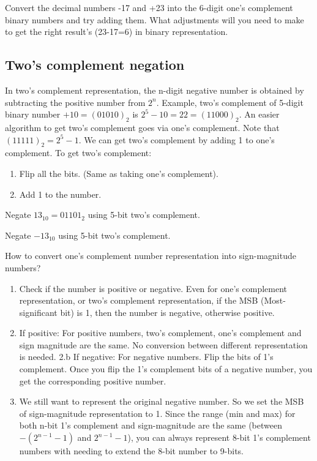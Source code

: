 \begin{prob}
  Convert the decimal numbers -17 and +23 into the 6-digit one's complement binary numbers and try adding them. What
  adjustments will you need to make to get the right result's (23-17=6) in binary representation.
\end{prob}
\vspace{20em}


\subsection{Two's complement negation}
In two's complement representation, the n-digit negative number is obtained by
subtracting the positive number from $2^{n}$. Example, two's
complement of 5-digit binary number $+10 = (01010)_2$ is $2^5 - 10 = 22 =
(11000)_2$. An easier algorithm to get two's complement goes via one's
complement. Note that $(11111)_2 = 2^5-1$. We can get two's complement by adding
1 to one's complement. To get two's complement:
\begin{enumerate}
\item Flip all the bits. (Same as taking one's complement).
\item Add 1 to the number.
\end{enumerate}

\noindent Negate $13_{10} = 01101_2$ using 5-bit two's complement.
\vspace{10em}

\noindent Negate $-13_{10}$ using 5-bit two's complement.
\vspace{10em}


How to convert one's complement number representation into sign-magnitude numbers?
\begin{enumerate}
\item Check if the number is positive or negative. Even for one's complement representation, or two's complement representation, if the MSB (Most-significant bit) is 1, then the number is negative, otherwise positive.
\item If positive: For positive numbers, two's complement, one's complement and sign magnitude are the same. No conversion between different representation is needed.
2.b If negative: For negative numbers. Flip the bits of 1's complement. Once you flip the 1's complement bits of a negative number, you get the corresponding positive number.
\item We still want to represent the original negative number. So we set the MSB of sign-magnitude representation to 1. Since the range (min and max) for both n-bit 1's complement and sign-magnitude are the same (between $-(2^{n-1}-1)$ and $2^{n-1}-1$), you can always represent 8-bit 1's complement numbers with needing to extend the 8-bit number to 9-bits.
\end{enumerate}

